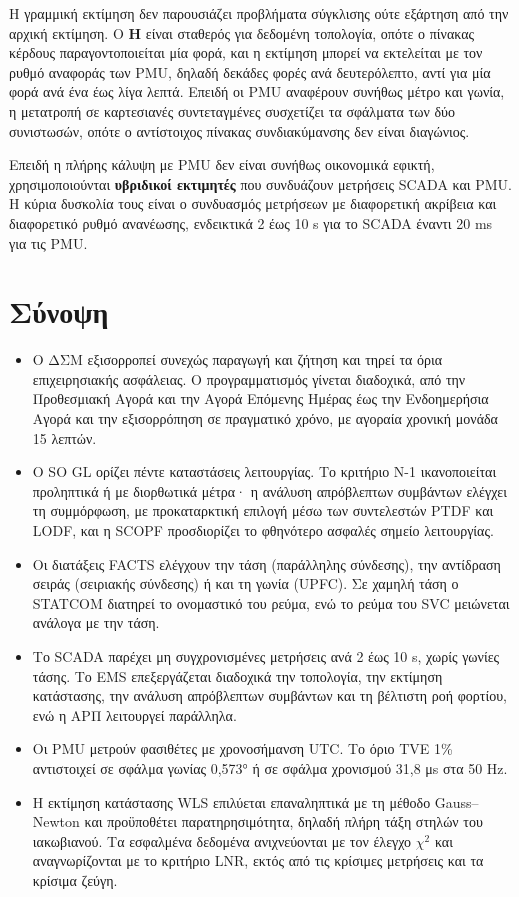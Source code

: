 Η γραμμική εκτίμηση δεν παρουσιάζει προβλήματα σύγκλισης ούτε εξάρτηση από την αρχική
εκτίμηση. Ο $\mathbf{H}$ είναι σταθερός για δεδομένη τοπολογία, οπότε ο πίνακας κέρδους
παραγοντοποιείται μία φορά, και η εκτίμηση μπορεί να εκτελείται με τον ρυθμό αναφοράς των
PMU, δηλαδή δεκάδες φορές ανά δευτερόλεπτο, αντί για μία φορά ανά ένα έως λίγα λεπτά. Επειδή
οι PMU αναφέρουν συνήθως μέτρο και γωνία, η μετατροπή σε καρτεσιανές συντεταγμένες συσχετίζει
τα σφάλματα των δύο συνιστωσών, οπότε ο αντίστοιχος πίνακας συνδιακύμανσης δεν είναι
διαγώνιος.

Επειδή η πλήρης κάλυψη με PMU δεν είναι συνήθως οικονομικά εφικτή, χρησιμοποιούνται
\textbf{υβριδικοί εκτιμητές} που συνδυάζουν μετρήσεις SCADA και PMU. Η κύρια δυσκολία τους
είναι ο συνδυασμός μετρήσεων με διαφορετική ακρίβεια και διαφορετικό ρυθμό ανανέωσης,
ενδεικτικά 2 έως 10 s για το SCADA έναντι 20 ms για τις PMU.

\section{Σύνοψη}

\begin{itemize}
\item Ο ΔΣΜ εξισορροπεί συνεχώς παραγωγή και ζήτηση και τηρεί τα όρια επιχειρησιακής ασφάλειας.
      Ο προγραμματισμός γίνεται διαδοχικά, από την Προθεσμιακή Αγορά και την Αγορά Επόμενης
      Ημέρας έως την Ενδοημερήσια Αγορά και την εξισορρόπηση σε πραγματικό χρόνο, με αγοραία
      χρονική μονάδα 15 λεπτών.
\item Ο SO GL ορίζει πέντε καταστάσεις λειτουργίας. Το κριτήριο N-1 ικανοποιείται προληπτικά ή
      με διορθωτικά μέτρα· η ανάλυση απρόβλεπτων συμβάντων ελέγχει τη συμμόρφωση, με
      προκαταρκτική επιλογή μέσω των συντελεστών PTDF και LODF, και η SCOPF προσδιορίζει το
      φθηνότερο ασφαλές σημείο λειτουργίας.
\item Οι διατάξεις FACTS ελέγχουν την τάση (παράλληλης σύνδεσης), την αντίδραση σειράς
      (σειριακής σύνδεσης) ή και τη γωνία (UPFC). Σε χαμηλή τάση ο STATCOM διατηρεί το
      ονομαστικό του ρεύμα, ενώ το ρεύμα του SVC μειώνεται ανάλογα με την τάση.
\item Το SCADA παρέχει μη συγχρονισμένες μετρήσεις ανά 2 έως 10 s, χωρίς γωνίες τάσης. Το EMS
      επεξεργάζεται διαδοχικά την τοπολογία, την εκτίμηση κατάστασης, την ανάλυση απρόβλεπτων
      συμβάντων και τη βέλτιστη ροή φορτίου, ενώ η ΑΡΠ λειτουργεί παράλληλα.
\item Οι PMU μετρούν φασιθέτες με χρονοσήμανση UTC. Το όριο TVE 1\% αντιστοιχεί σε σφάλμα
      γωνίας 0,573° ή σε σφάλμα χρονισμού 31,8 μs στα 50 Hz.
\item Η εκτίμηση κατάστασης WLS επιλύεται επαναληπτικά με τη μέθοδο Gauss--Newton και
      προϋποθέτει παρατηρησιμότητα, δηλαδή πλήρη τάξη στηλών του ιακωβιανού. Τα εσφαλμένα
      δεδομένα ανιχνεύονται με τον έλεγχο $\chi^2$ και αναγνωρίζονται με το κριτήριο LNR, εκτός
      από τις κρίσιμες μετρήσεις και τα κρίσιμα ζεύγη.
\end{itemize}

